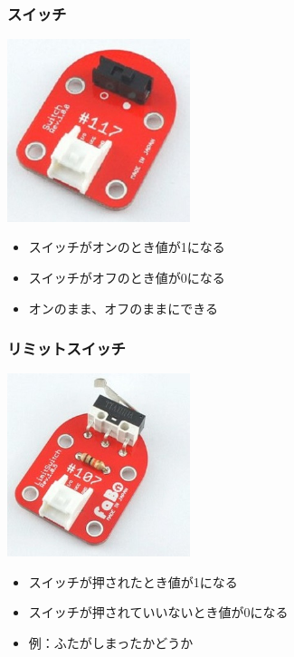 \begin{frame}
    \frametitle{スイッチ}
    \begin{center}
        \includegraphics[width=0.4\textwidth]{images/chap05/text05-img019.jpg}
        \begin{itemize}
            \item スイッチがオンのとき値が1になる
            \item スイッチがオフのとき値が0になる
            \item オンのまま、オフのままにできる
        \end{itemize}
    \end{center}
\end{frame}

\begin{frame}
    \frametitle{リミットスイッチ}
    \begin{center}
        \includegraphics[width=0.4\textwidth]{images/chap05/text05-img020.jpg}
        \begin{itemize}
            \item スイッチが押されたとき値が1になる
            \item スイッチが押されていいないとき値が0になる
            \item 例：ふたがしまったかどうか
        \end{itemize}
    \end{center}
\end{frame}

